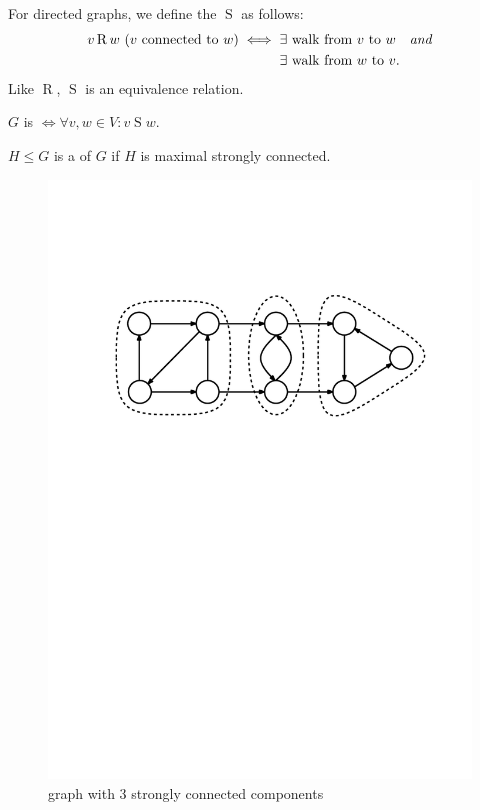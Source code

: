 \begin{definition}
For directed graphs, we define the  $\operatorname{S}$ as follows:
\begin{align*}
v \operatorname{R} w \text{ ($v$ connected to $w$)} \iff \null
&\text{$\exists$ walk from $v$ to $w$\quad\emph{and}} \\
&\text{$\exists$ walk from $w$ to $v$.}
\end{align*}
Like $\operatorname{R}$, $\operatorname{S}$ is an equivalence relation.
\end{definition}

\begin{definition}
$G$ is  $\iff \forall v,w\in V: v \operatorname{S} w$.
\end{definition}

\begin{definition}
$H\leq G$ is a  of $G$ if $H$ is maximal strongly connected.
\end{definition}

\begin{figure}[htb]
	\centering
	\includegraphics[scale=.5]{01_graph_theory/pics/strongly-connected_component.pdf}
	\caption{graph with 3 strongly connected components}
\end{figure}
\FloatBarrier


